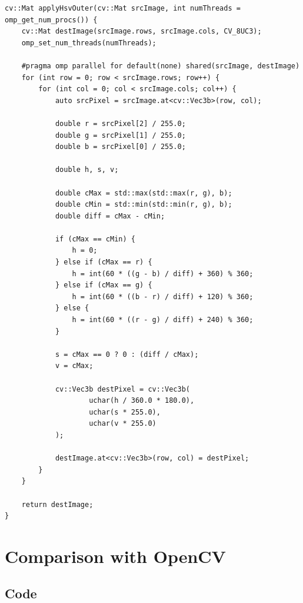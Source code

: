 \begin{listing}[H]
    \begin{verbatim}
cv::Mat applyHsvOuter(cv::Mat srcImage, int numThreads = omp_get_num_procs()) {
    cv::Mat destImage(srcImage.rows, srcImage.cols, CV_8UC3);
    omp_set_num_threads(numThreads);

    #pragma omp parallel for default(none) shared(srcImage, destImage)
    for (int row = 0; row < srcImage.rows; row++) {
        for (int col = 0; col < srcImage.cols; col++) {
            auto srcPixel = srcImage.at<cv::Vec3b>(row, col);

            double r = srcPixel[2] / 255.0;
            double g = srcPixel[1] / 255.0;
            double b = srcPixel[0] / 255.0;

            double h, s, v;

            double cMax = std::max(std::max(r, g), b);
            double cMin = std::min(std::min(r, g), b);
            double diff = cMax - cMin;

            if (cMax == cMin) {
                h = 0;
            } else if (cMax == r) {
                h = int(60 * ((g - b) / diff) + 360) % 360;
            } else if (cMax == g) {
                h = int(60 * ((b - r) / diff) + 120) % 360;
            } else {
                h = int(60 * ((r - g) / diff) + 240) % 360;
            }

            s = cMax == 0 ? 0 : (diff / cMax);
            v = cMax;

            cv::Vec3b destPixel = cv::Vec3b(
                    uchar(h / 360.0 * 180.0),
                    uchar(s * 255.0),
                    uchar(v * 255.0)
            );

            destImage.at<cv::Vec3b>(row, col) = destPixel;
        }
    }

    return destImage;
}
    \end{verbatim}
    \label{listing:hsv}
\end{listing}

\section{Comparison with OpenCV}

\subsection{Code}


